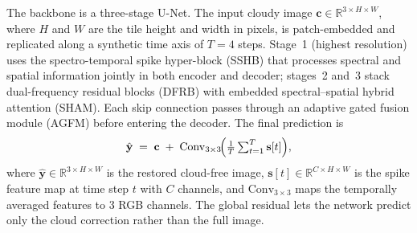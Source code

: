 \documentclass[conference]{IEEEtran}
\newcommand{\OrbitALIF}{\textsc{OrbitALIF}}
\newcommand{\DFRB}{\textsc{DFRB}}
\newcommand{\SHAM}{\textsc{SHAM}}
\newcommand{\AGFM}{\textsc{AGFM}}
\newcommand{\SSHB}{\textsc{SSHB}}
\begin{document}
The backbone is a three-stage U-Net. The input cloudy image
$\mathbf{c}\in\mathbb{R}^{3\times H\times W}$, where $H$ and $W$ are
the tile height and width in pixels, is patch-embedded and replicated
along a synthetic time axis of $T\!=\!4$ steps. Stage~1 (highest
resolution) uses the spectro-temporal spike hyper-block (\SSHB{})
that processes spectral and spatial information jointly in both
encoder and decoder; stages~2 and~3 stack dual-frequency residual
blocks (\DFRB{}) with embedded spectral--spatial hybrid attention
(\SHAM{}). Each skip connection passes through an adaptive gated
fusion module (\AGFM{}) before entering the decoder.
The final prediction is
\begin{equation}
    \hat{\mathbf{y}} \;=\; \mathbf{c} \;+\;
    \mathrm{Conv}_{3\times3}\!\Bigl(
    \tfrac{1}{T}\textstyle\sum_{t=1}^{T}\mathbf{s}[t]\Bigr),
    \label{eq:globalresidual}
\end{equation}
where $\hat{\mathbf{y}}\in\mathbb{R}^{3\times H\times W}$ is the
restored cloud-free image, $\mathbf{s}[t]\in\mathbb{R}^{C\times H
\times W}$ is the spike feature map at time step $t$ with $C$ channels,
and $\mathrm{Conv}_{3\times3}$ maps the temporally averaged features to
3 RGB channels. The global residual lets the network predict only the
cloud correction rather than the full image. 


\end{document}

